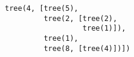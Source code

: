 \begin{lstlisting}
tree(4, [tree(5),
         tree(2, [tree(2),
                  tree(1)]),
         tree(1),
         tree(8, [tree(4)])])
\end{lstlisting}
